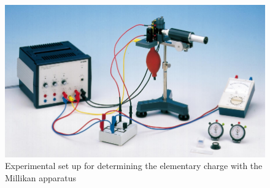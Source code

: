 \documentclass[%
 reprint,
 amsmath,amssymb,
 aps,
]{revtex4-2}
\begin{document}
    \begin{figure}[b]
        \centering
        \includegraphics[scale = 0.35]{Figures/setup.png}
        \caption{Experimental set up for determining the elementary charge with the Millikan apparatus}
        \label{fig:setup}
    \end{figure}
    
\end{document}

